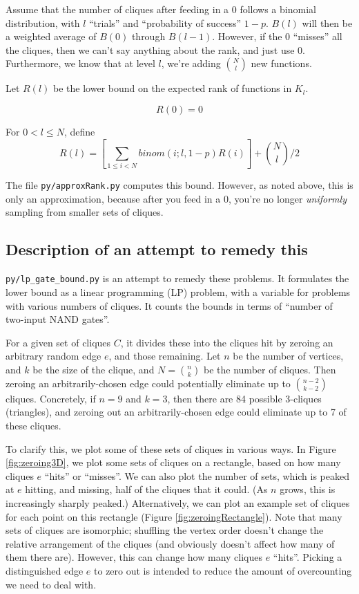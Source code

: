 \documentclass[12pt]{article}
\theoremstyle{definition}
\begin{document}
Assume that the number of cliques after feeding in a 0 follows a binomial
distribution, with $l$ ``trials'' and ``probability of success'' $1-p$.
$B(l)$ will then be a weighted average of $B(0)$ through $B(l-1)$. However,
if the 0 ``misses'' all the cliques, then we can't say anything about the
rank, and just use 0.
Furthermore, we know that at level $l$, we're adding ${N \choose l}$ new
functions.


Let $R(l)$ be the lower bound on the expected rank of functions in $K_l$.

\[
R(0) = 0
\]

For $0 < l \le N$, define
\[
	R(l) = [ \sum_{1\le i < N} binom(i; l, 1-p) R(i) ] + {N \choose l}/2
\]

The file {\tt py/approxRank.py} computes this bound. However, as noted above, this
is only an approximation, because after you feed in a 0, you're no longer
{\em uniformly} sampling from smaller sets of cliques.

\subsection{Description of an attempt to remedy this}

{\tt py/lp\_gate\_bound.py} is an attempt to remedy these problems.
It formulates the lower bound as a linear programming (LP) problem,
with a variable for problems with various numbers of cliques.
It counts the bounds in terms of ``number of two-input NAND gates''.

For a given set of cliques $C$, it divides these into the cliques
hit by zeroing an arbitrary random edge $e$, and those remaining.
Let $n$ be the number of vertices, and $k$ be the size of the clique,
and $N = {n \choose k}$ be the number of cliques. Then zeroing
an arbitrarily-chosen edge could potentially eliminate up to
${n-2 \choose k-2}$ cliques.
Concretely, if $n=9$ and $k=3$, then there are 84 possible 3-cliques
(triangles), and zeroing out an arbitrarily-chosen edge could
eliminate up to 7 of these cliques.

To clarify this, we plot some of these sets of cliques in various ways.
In Figure \ref{fig:zeroing3D},
we plot some sets of cliques on a rectangle, based on how many cliques $e$ ``hits'' or ``misses''.
We can also plot the number of sets, which
is peaked at $e$ hitting, and missing, half of the cliques that it could.
(As $n$ grows, this is increasingly sharply peaked.)
Alternatively, we can plot an example set of cliques for each point on this rectangle
(Figure \ref{fig:zeroingRectangle}). Note that many sets of cliques are isomorphic;
shuffling the vertex order doesn't change the relative arrangement of the cliques
(and obviously doesn't affect how many of them there are). However, this can change
how many cliques $e$ ``hits''. Picking a distinguished edge $e$ to zero out
is intended to reduce the amount of overcounting we need to deal with.
\end{document}
